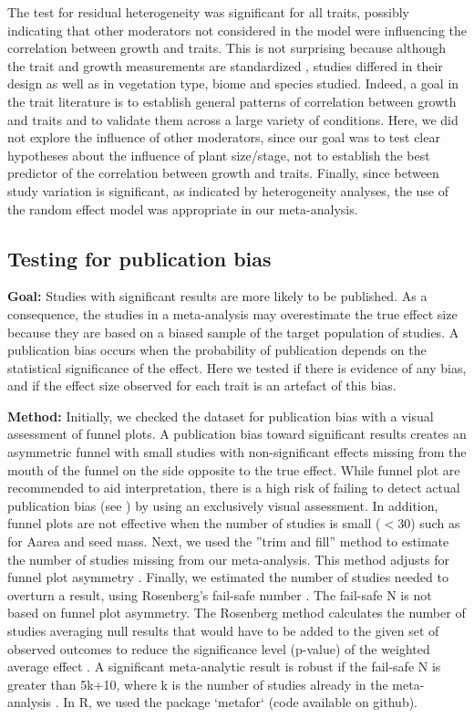 \documentclass[a4paper,11pt]{article}
\begin{document}
\begin{appendices}
The test for residual heterogeneity was significant for all traits, possibly indicating that other moderators not considered in the model were influencing the correlation between growth and traits. This is not surprising because although the trait and growth measurements are standardized \citep{Cornelissen:2003gw}, studies differed in their design as well as in vegetation type, biome and species studied. Indeed, a goal in the trait literature is to establish general patterns of correlation between growth and traits and to validate them across a large variety of conditions. Here, we did not explore the influence of other moderators, since our goal was to test clear hypotheses about the influence of plant size/stage, not to establish the best predictor of the correlation between growth and traits. Finally, since between study variation is significant, as indicated by heterogeneity analyses, the use of the random effect model was appropriate in our meta-analysis.

\subsection{Testing for publication bias}
\textbf{Goal:} Studies with significant results are more likely to be published. As a consequence, the studies in a meta-analysis may overestimate the true effect size because they are based on a biased sample of the target population of studies. A publication bias occurs when the probability of publication depends on the statistical significance of the effect. Here we tested if there is evidence of any bias, and if the effect size observed for each trait is an artefact of this bias.

\textbf{Method:} Initially, we checked the dataset for publication bias with a visual assessment of funnel plots. A publication bias toward significant results creates an asymmetric funnel with small studies with non-significant effects missing from the mouth of the funnel on the side opposite to the true effect. While funnel plot are recommended to aid interpretation, there is a high risk of failing to detect actual publication bias (see \citealt{Koricheva:2013tz}) by using an exclusively visual assessment. In addition, funnel plots are not effective when the number of studies is small ($<30$) such as for Aarea and seed mass.
Next, we used the ''trim and fill'' method to estimate the number of studies missing from our meta-analysis. This method adjusts for funnel plot asymmetry \citep{Duval:2000dg}.
Finally, we estimated the number of studies needed to overturn a result, using Rosenberg’s fail-safe number \citep{Rosenberg:2005hk}. The fail-safe N is not based on funnel plot asymmetry. The Rosenberg method calculates the number of studies averaging null results that would have to be added to the given set of observed outcomes to reduce the significance level (p-value) of the weighted average effect \citep{Rosenberg:2005hk}. A significant meta-analytic result is robust if the fail-safe N is greater than 5k+10, where k is the number of studies already in the meta-analysis \citep{Rosenthal:1979do}.
In R, we used the package `metafor` (code available on github).


\end{appendices}
\end{document}

